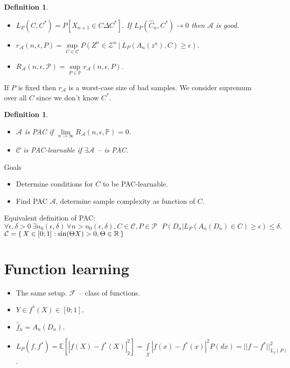 \documentclass[10pt]{article}
\newtheorem{definition}[def]{Definition}
\newcommand{\Expect}[1]{\mathbb{E}\!\left[#1\right]}
\renewcommand{\P}{\mathbb{P}}
\newcommand{\R}{\mathbb{R}}
\newcommand{\X}{\mathcal{X}}
\renewcommand{\hat}{\widehat}
\newcommand{\A}{\mathcal{A}}
\newcommand{\Pcal}{\mathcal{P}}
\newcommand{\Z}{\mathcal{Z}}
\newcommand{\C}{\mathcal{C}}
\newcommand{\Fun}{\mathcal{F}}
\begin{document}
\begin{definition} \

\begin{itemize}
  \item $L_P(C,C^*) = P[X_{n+1} \in C \Delta C^*]$.
        If $L_P(\hat C_n, C^*) \to 0$ then $\A$ is good.
  \item $r_\A(n,\epsilon,P) = \sup\limits_{C \in \C} P(Z^n \in \Z^n\ |\ L_P(A_n(z^n), C) \geq \epsilon)$.
  \item $R_\A(n,\epsilon,\Pcal) = \sup\limits_{P \in \P} r_\A(n,\epsilon,P)$.
\end{itemize}
\end{definition}
If $P$ is fixed then  $r_\A$ is a worst-case size of bad samples.
We consider supremum over all $C$ since we don't know $C^*$.

\begin{definition} \

\begin{itemize}
  \item $\A$ is PAC if $\lim\limits_{n \to \infty} R_\A(n,\epsilon,\P) = 0$.
  \item $\C$ is PAC-learnable if $\exists \A$~-- is PAC.
\end{itemize}
\end{definition}
Goals
\begin{itemize}
  \item Determine conditions for $C$ to be PAC-learnable.
  \item Find PAC $\A$, determine sample complexity as function of $C$.
\end{itemize}
Equivalent definition of PAC:
\[\forall \epsilon,\delta>0\ \exists n_0(\epsilon, \delta)\ \forall n > n_0(\epsilon, \delta), C \in \C, P \in \Pcal
  \ \ \ P(D_n | L_P(A_n(D_n) \in C) \geq \epsilon) \leq \delta.\]
$\C = \set{X \in [0;1]: \sin(\Theta X) > 0, \Theta \in \R}$

\section{Function learning}
\begin{itemize}
  \item The same setup. $\Fun$~-- class of functions.
  \item $Y \in f^*(X) \in [0;1]$.
  \item $\hat f_n = A_n(D_n)$.
  \item $L_P(f,f^*) = \Expect{|f(X) - f^*(X)|_2^2} = \int\limits_\X |f(x) - f^*(x)|^2 P(dx) = ||f - f^*||^2_{L_2(P)}$.
\end{itemize}
\end{document}

